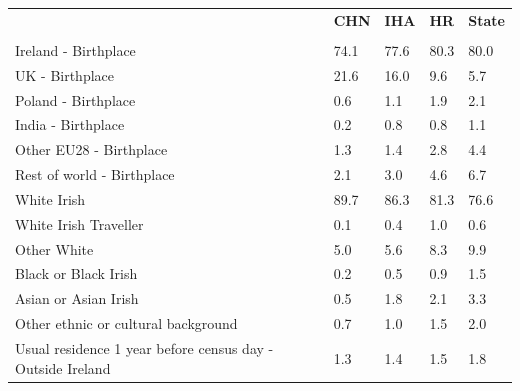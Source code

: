 \documentclass{article}
\begin{document}
\pagebreak
\begin{table}[h]	
\centering
		\begin{tabular}{KTTTT}
  \hline
& \textbf{CHN} & \textbf{IHA} & \textbf{HR}& \textbf{State}\\ 
  \hline
    \\ 
    \hline
Ireland - Birthplace & 74.1& 77.6& 80.3& 80.0\\
UK - Birthplace & 21.6& 16.0&  9.6&  5.7\\
Poland - Birthplace & 0.6& 1.1& 1.9& 2.1\\
India - Birthplace & 0.2& 0.8& 0.8& 1.1\\
Other EU28 - Birthplace & 1.3& 1.4& 2.8& 4.4\\
Rest of world - Birthplace & 2.1& 3.0& 4.6& 6.7\\
    \hline
White Irish & 89.7& 86.3& 81.3& 76.6\\
White Irish Traveller & 0.1& 0.4& 1.0& 0.6\\
Other White & 5.0& 5.6& 8.3& 9.9\\
Black or Black Irish & 0.2& 0.5& 0.9& 1.5\\
Asian or Asian Irish & 0.5& 1.8& 2.1& 3.3\\
Other ethnic or cultural background & 0.7& 1.0& 1.5& 2.0\\
    \hline
Usual residence 1 year before census day - Outside Ireland & 1.3& 1.4& 1.5& 1.8\\


\end{tabular}
\end{table}
\end{document}
